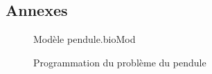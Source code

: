 \begin{appendix}
    \chapter{Annexes}
\label{code_pendule_bioMod}
\begin{center}

\vspace{-0.6cm}
\begin{figure}[h]
\caption{Modèle pendule.bioMod}
\end{figure}
\end{center}

\label{code_pendule_python}
\begin{center}

\vspace{-0.6cm}
\begin{figure}[h]
\caption{Programmation du problème du pendule}
\end{figure}
\end{center}

    
\end{appendix}
